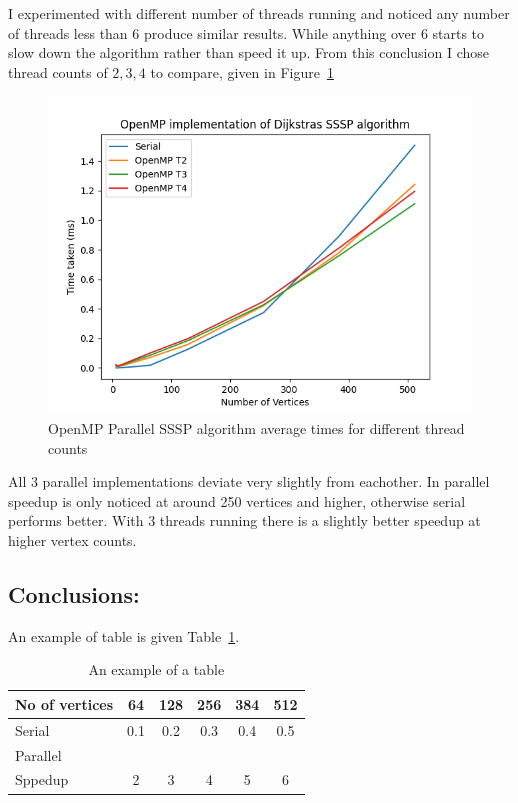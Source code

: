 	I experimented with different number of threads running and noticed any number of threads less than 6 produce similar results. While anything over 6 starts to slow down the algorithm rather than speed it up. From this conclusion I chose thread counts of $2,3,4$ to compare, given in Figure~\ref{fig:fig_sssp_omp}
	\begin{figure}[!htb]
		\centering
		\includegraphics[width=0.6\linewidth]{sssp_omp.png}
		\caption{OpenMP Parallel SSSP algorithm average times for different thread counts}
		\label{fig:fig_sssp_omp}
	\end{figure}

	All 3 parallel implementations deviate very slightly from eachother. In parallel speedup is only noticed at around 250 vertices and higher, otherwise serial performs better. With 3 threads running there is a slightly better speedup at higher vertex counts.
	
	\newpage
	\subsection{Conclusions:}
	An example of table is given Table~\ref{tab:example}.
	\begin{table}[!htb]
		\centering
		\caption{An example of a table}\label{tab:example}
		\begin{tabular}{l|ccccc}
			\toprule
			No of vertices & 64 & 128 & 256 & 384 & 512\\
			\midrule
			Serial &0.1&0.2&0.3&0.4&0.5\\
			Parallel &&&&\\
			Sppedup &2&3&4&5&6\\
			\bottomrule
		\end{tabular}
	\end{table} 
	
	\newpage
	
	
 

